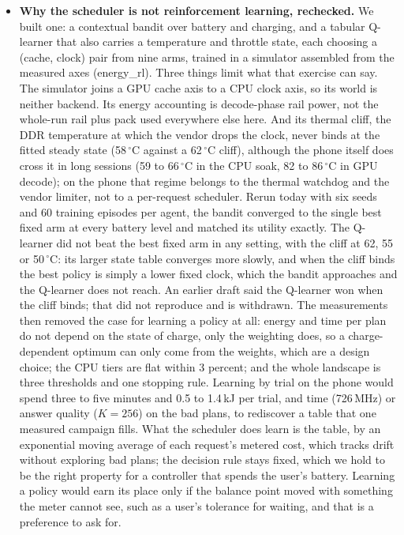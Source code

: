 \documentclass[11pt]{article}
\begin{document}
\begin{itemize}
\item \textbf{Why the scheduler is not reinforcement learning, rechecked.} We built one: a
contextual bandit over battery and charging, and a tabular Q-learner that also carries a
temperature and throttle state, each choosing a (cache, clock) pair from nine arms, trained in
a simulator assembled from the measured axes (energy\_rl). Three things limit what that
exercise can say. The simulator joins a GPU cache axis to a CPU clock axis, so its world is
neither backend. Its energy accounting is decode-phase rail power, not the whole-run rail plus
pack used everywhere else here. And its thermal cliff, the DDR temperature at which the vendor
drops the clock, never binds at the fitted steady state (58\,$^\circ$C against a 62\,$^\circ$C
cliff), although the phone itself does cross it in long sessions (59 to 66\,$^\circ$C in the
CPU soak, 82 to 86\,$^\circ$C in GPU decode); on the phone that regime belongs to the thermal
watchdog and the vendor limiter, not to a per-request scheduler. Rerun today with six seeds
and 60 training episodes per agent, the bandit converged to the single best fixed arm at every
battery level and matched its utility exactly. The Q-learner did not beat the best fixed arm
in any setting, with the cliff at 62, 55 or 50\,$^\circ$C: its larger state table converges
more slowly, and when the cliff binds the best policy is simply a lower fixed clock, which the
bandit approaches and the Q-learner does not reach. An earlier draft said the Q-learner won
when the cliff binds; that did not reproduce and is withdrawn. The measurements then removed
the case for learning a policy at all: energy and time per plan do not depend on the state of
charge, only the weighting does, so a charge-dependent optimum can only come from the weights,
which are a design choice; the CPU tiers are flat within 3 percent; and the whole landscape is
three thresholds and one stopping rule. Learning by trial on the phone would spend three to
five minutes and 0.5 to 1.4\,kJ per trial, and time (726\,MHz) or answer quality ($K{=}256$)
on the bad plans, to rediscover a table that one measured campaign fills. What the scheduler
does learn is the table, by an exponential moving average of each request's metered cost,
which tracks drift without exploring bad plans; the decision rule stays fixed, which we hold
to be the right property for a controller that spends the user's battery. Learning a policy
would earn its place only if the balance point moved with something the meter cannot see,
such as a user's tolerance for waiting, and that is a preference to ask for.


\end{itemize}
\end{document}
